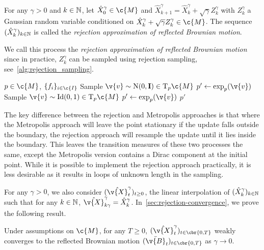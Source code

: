 \begin{definition}
	For any \(\gamma > 0\) and \(k \in \mathbb{N}\), let \(\hat{X}_0^\gamma \in \c{M}\) and \(\hat{X}_{k+1}^\gamma = \hat{X}_k^\gamma + \sqrt{\gamma} Z_k^\gamma\) with \(Z_k^\gamma\) a Gaussian random variable conditioned on \(\hat{X}_k^\gamma + \sqrt{\gamma} Z_k^\gamma \in \c{M}\).
	The sequence \((\hat{X}_k^\gamma)_{k \in \mathbb{N}}\) is called the \emph{rejection approximation of reflected Brownian motion}.
\end{definition}
We call this process the \emph{rejection approximation of reflected Brownian motion} since in practice, \(Z_k^\gamma\) can be sampled using rejection sampling, see~\cref{alg:rejection_sampling}.
\begin{algorithm}[H]
	\caption[]{\protect{}}
	\label{alg:rejection_sampling}
	\begin{algorithmic}
		\Require \(p \in \c{M}\), \(\{f_i\}_{i \in \c{I}}\)
		\State Sample \(\v{v} \sim \mathrm{N}(0,\m{I}) \in \mathrm{T}_p\c{M}\)
		\State \(p' \gets \exp_{p}(\v{v})\)
		\State Sample \(\v{v} \sim \mathrm{Id}(0,1) \in \mathrm{T}_p\c{M}\)
		\State \(p' \gets \exp_{p}(\v{v})\)
		\EndWhile
		\Return \(p'\)
	\end{algorithmic}
\end{algorithm}
The key difference between the rejection and Metropolis approaches is that where the Metropolis approach will leave the point stationary if the update falls outside the boundary, the rejection approach will resample the update until it lies inside the boundary.
This leaves the transition measures of these two processes the same, except the Metropolis version contains a Dirac component at the initial point.
While it is possible to implement the rejection approach practically, it is less desirable as it results in loops of unknown length in the sampling.

For any \(\gamma > 0\), we also consider \((\hat{\v{X}}_t^\gamma)_{t \geq 0}\), the linear interpolation of \((\hat{X}^\gamma_k)_{k \in \mathbb{N}}\) such that for any \(k \in \mathbb{N}\), \(\hat{\v{X}}_{k \gamma}^\gamma = \hat{X}_k^\gamma\).
In~\cref{sec:rejection-convergence}, we prove the following result.

\begin{theorem}
	\label{thm:weak_convergence_rejection}
	Under assumptions on \(\c{M}\), for any \(T \geq 0\), \((\hat{\v{X}}_t^\gamma)_{t \in \cbr{0,T}}\) weakly converges to the reflected Brownian motion \((\bar{\v{B}}_t)_{t \in \cbr{0,T}}\) as \(\gamma \to 0\).
\end{theorem}

